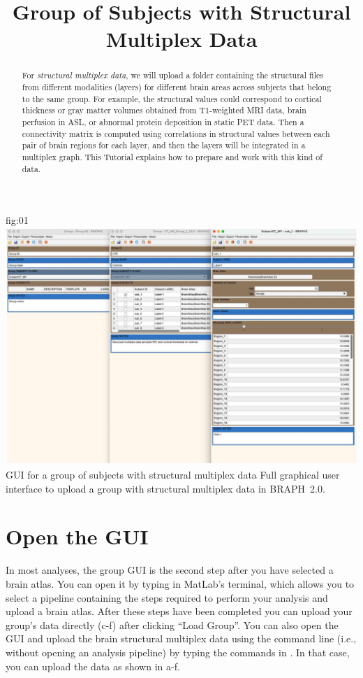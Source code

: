 \documentclass[justified]{tufte-handout}
\title{Group of Subjects with Structural Multiplex Data}
\begin{document}
\maketitle

\begin{abstract}
\noindent
For \emph{structural multiplex data}, we will upload a folder containing the structural files from different modalities (layers) for different brain areas across subjects that belong to the same group. For example, the structural values could correspond to cortical thickness or gray matter volumes obtained from T1-weighted MRI data, brain perfusion in ASL, or abnormal protein deposition in static PET data. Then a connectivity matrix is computed using correlations in structural values between each pair of brain regions for each layer, and then the layers will be integrated in a multiplex graph. This Tutorial explains how to prepare and work with this kind of data.
\end{abstract}

\tableofcontents

	{fig:01}
	{\includegraphics{fig01.jpg}}
	{GUI for a group of subjects with structural multiplex data}
	{
	Full graphical user interface to upload a group with structural multiplex data in BRAPH~2.0. 
	}

\clearpage
\section{Open the GUI}

In most analyses, the group GUI is the second step after you have selected a brain atlas. You can open it by typing  in MatLab's terminal, which allows you to select a pipeline containing the steps required to perform your analysis and upload a brain atlas. After these steps have been completed you can upload your group's data directly (c-f) after clicking ``Load Group''. You can also open the GUI and upload the brain structural multiplex data using the command line (i.e., without opening an analysis pipeline) by typing the commands in . In that case, you can upload the data as shown in a-f.
\end{document}
